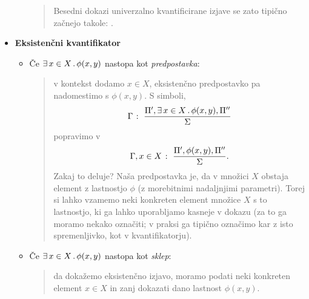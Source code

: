 \begin{itemize}
\begin{itemize}
\begin{quote}
                                                Besedni dokazi univerzalno kvantificirane izjave se zato tipično začnejo takole: .
                                        \end{quote}
                        \end{itemize}
                \item\textbf{Eksistenčni kvantifikator}
                        \begin{itemize}
                                \item
                                        Če $\xsome{x}[X]{\phi(x, y)}$ nastopa kot \emph{predpostavka}:
                                        \begin{quote}
                                                v kontekst dodamo $x \in X$, eksistenčno predpostavko pa nadomestimo s $\phi(x, y)$. S simboli,
                                                \[\claim{\Gamma}{\Pi', \xsome{x}[X]{\phi(x, y)}, \Pi''}{\Sigma}\]
                                                popravimo v
                                                \[{\Gamma, x \in X} \;\colon\; \frac{\Pi', \phi(x, y), \Pi''}{\Sigma}.\]
                                                Zakaj to deluje? Naša predpostavka je, da v množici $X$ obstaja element z lastnostjo $\phi$ (z morebitnimi nadaljnjimi parametri). Torej si lahko vzamemo neki konkreten element množice $X$ s to lastnostjo, ki ga lahko uporabljamo kasneje v dokazu (za to ga moramo nekako označiti; v praksi ga tipično označimo kar z isto spremenljivko, kot v kvantifikatorju).
                                        \end{quote}
                                \item
                                        Če $\xsome{x}[X]{\phi(x, y)}$ nastopa kot \emph{sklep}:
                                        \begin{quote}
                                                da dokažemo eksistenčno izjavo, moramo podati neki konkreten element $x \in X$ in zanj dokazati dano lastnost $\phi(x, y)$. 
                                        \end{quote}
                        \end{itemize}
        \end{itemize}


